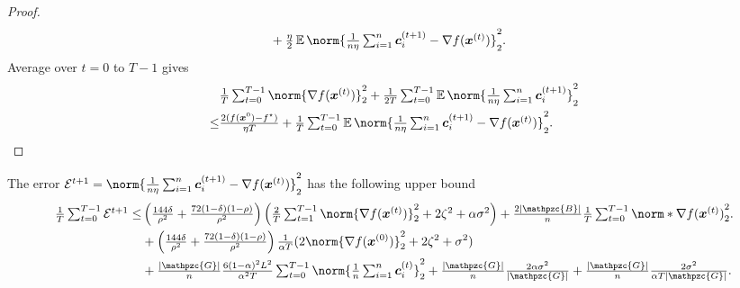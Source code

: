 \documentclass{article}
\newcommand{\gset}{\ensuremath{{\mathpzc{G}}}}
\newcommand{\bset}{\ensuremath{{\mathpzc{B}}}}
\begin{document}
\begin{proof}
\begin{align*}
                          & + \tfrac{\eta}{2} \E\norm{\tfrac{1}{n\eta} \tsum_{i=1}^n \cc_i^{(t+1)} - \nabla f(\xx^{(t)})}_2^2.
  \end{align*}
  Average over $t=0$ to $T-1$ gives
  \begin{align*}
        & \tfrac{1}{T}\tsum_{t=0}^{T-1} \norm{\nabla f(\xx^{(t)})}_2^2 + \tfrac{1}{2T}\tsum_{t=0}^{T-1} \E \norm{\tfrac{1}{n\eta} \tsum_{i=1}^n \cc_i^{(t+1)} }_2^2 \\
    \le & \tfrac{2(f(\xx^{0}) - f^\star )}{\eta T}
    + \tfrac{1}{T}\tsum_{t=0}^{T-1} \E \norm{ \tfrac{1}{n\eta} \tsum_{i=1}^n \cc_i^{(t+1)}  - \nabla f(\xx^{(t)}) }_2^2.
  \end{align*}
\end{proof}


\begin{lemma}\label{lemma:cE}
  The error $\cE^{t+1}=\norm{ \tfrac{1}{n\eta} \tsum_{i=1}^n \cc_i^{(t+1)}  - \nabla f(\xx^{(t)}) }_2^2$ has the following  upper bound
  \begin{align*}
    \tfrac{1}{T}\tsum_{t=0}^{T-1}\cE^{t+1}
    \le &
    \left( \tfrac{144\delta}{\rho^2} +\tfrac{72(1-\delta)(1-\rho)}{\rho^2}\right) \left(\tfrac{2}{T}\tsum_{t=1}^{T-1} \norm{\nabla f(\xx^{(t)}) }_2^2
    +  2  \zeta^2
    + \alpha\sigma^2 \right)
    + \tfrac{2|\bset|}{n}\tfrac{1}{T}\tsum_{t=0}^{T-1} \norm*{ \nabla f(\xx^{(t)}) }_2^2.                                                      \\
        & + \left( \tfrac{144\delta}{\rho^2} +\tfrac{72(1-\delta)(1-\rho)}{\rho^2}\right) \tfrac{1}{\alpha T}(2\norm{\nabla f(\xx^{(0)}) }_2^2
    + 2 \zeta^2 + \sigma^2)                                                                                                                    \\
        & + \tfrac{|\gset|}{n} \tfrac{6(1-\alpha)^2L^2}{\alpha^2T} \tsum_{t=0}^{T-1}
    \norm{ \tfrac{1}{n} \tsum_{i=1}^n \cc_i^{(t)} }_2^2
    + \tfrac{|\gset|}{n} \tfrac{2\alpha\sigma^2}{|\gset|} + \tfrac{|\gset|}{n} \tfrac{2\sigma^2}{ \alpha  T|\gset|}.
  \end{align*}\end{lemma}
\end{document}

